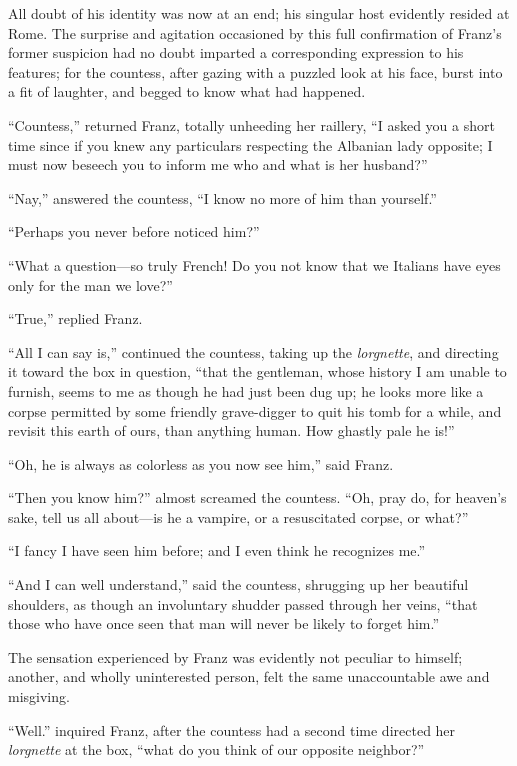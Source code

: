 All doubt of his identity was now at an end; his singular host
evidently resided at Rome. The surprise and agitation occasioned by
this full confirmation of Franz’s former suspicion had no doubt
imparted a corresponding expression to his features; for the countess,
after gazing with a puzzled look at his face, burst into a fit of
laughter, and begged to know what had happened.

“Countess,” returned Franz, totally unheeding her raillery, “I asked
you a short time since if you knew any particulars respecting the
Albanian lady opposite; I must now beseech you to inform me who and
what is her husband?”

“Nay,” answered the countess, “I know no more of him than yourself.”

“Perhaps you never before noticed him?”

“What a question—so truly French! Do you not know that we Italians have
eyes only for the man we love?”

“True,” replied Franz.

“All I can say is,” continued the countess, taking up the \textit{lorgnette},
and directing it toward the box in question, “that the gentleman, whose
history I am unable to furnish, seems to me as though he had just been
dug up; he looks more like a corpse permitted by some friendly
grave-digger to quit his tomb for a while, and revisit this earth of
ours, than anything human. How ghastly pale he is!”

“Oh, he is always as colorless as you now see him,” said Franz.

“Then you know him?” almost screamed the countess. “Oh, pray do, for
heaven’s sake, tell us all about—is he a vampire, or a resuscitated
corpse, or what?”

“I fancy I have seen him before; and I even think he recognizes me.”

“And I can well understand,” said the countess, shrugging up her
beautiful shoulders, as though an involuntary shudder passed through
her veins, “that those who have once seen that man will never be likely
to forget him.”

The sensation experienced by Franz was evidently not peculiar to
himself; another, and wholly uninterested person, felt the same
unaccountable awe and misgiving.

“Well.” inquired Franz, after the countess had a second time directed
her \textit{lorgnette} at the box, “what do you think of our opposite
neighbor?”

